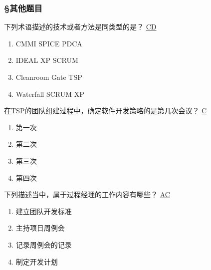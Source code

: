 \subsubsection*{\S 其他题目}
\setcounter{problemname}{0}

\begin{problem}
	下列术语描述的技术或者方法是同类型的是？
	\uline{CD}    
    \vspace{-0.8em}
    \begin{multicols}{2}
        \begin{enumerate}[label=\Alph*.]
            \item CMMI SPICE PDCA
            \item IDEAL XP SCRUM
            \item Cleanroom Gate TSP
            \item Waterfall SCRUM XP
        \end{enumerate}
    \end{multicols}
    \vspace{-1em}
\end{problem}




\begin{problem}
	在TSP的团队组建过程中，确定软件开发策略的是第几次会议？
	\uline{C}    
    \vspace{-0.8em}
    \begin{multicols}{4}
        \begin{enumerate}[label=\Alph*.]
            \item 第一次
            \item 第二次
            \item 第三次
            \item 第四次
        \end{enumerate}
    \end{multicols}
    \vspace{-1em}
\end{problem}




\begin{problem}
	下列描述当中，属于过程经理的工作内容有哪些？
	\uline{AC}    
    \vspace{-0.8em}
    \begin{multicols}{4}
        \begin{enumerate}[label=\Alph*.]
            \item 建立团队开发标准
            \item 主持项日周例会
            \item 记录周例会的记录
            \item 制定开发计划
        \end{enumerate}
    \end{multicols}
    \vspace{-1em}
\end{problem}




